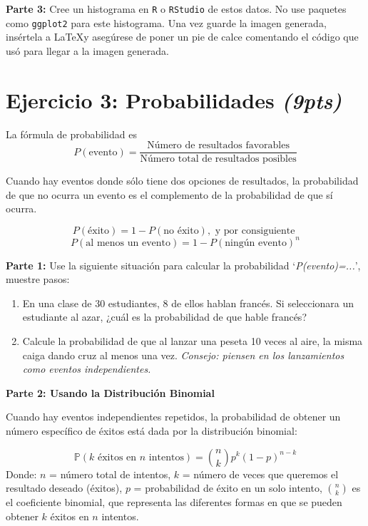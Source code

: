 \documentclass[11pt]{article}
\begin{document}
\textbf{Parte 3:} Cree un histograma en \texttt{R} o \texttt{RStudio} de estos datos. No use paquetes como \texttt{ggplot2} para este histograma. Una vez guarde la imagen generada, insértela a \LaTeX y asegúrese de poner un pie de calce comentando el código que usó para llegar a la imagen generada.
\vspace{3cm} %


\section*{Ejercicio 3: Probabilidades \textit{(9pts)}} 
La fórmula de probabilidad es
\[
P(\text{evento}) = \frac{\text{Número de resultados favorables}}{\text{Número total de resultados posibles}}
\]

Cuando hay eventos donde sólo tiene dos opciones de resultados, la probabilidad de que no ocurra un evento es el complemento de la probabilidad de que sí ocurra.

\[
P(\text{éxito}) = 1 - P(\text{no éxito}), \text{ y por consiguiente } 
\]
\[
P(\text{al menos un evento}) = 1 - P(\text{ningún evento})^n
\]

\textbf{Parte 1:} Use la siguiente situación para calcular la probabilidad ‘\textit{P(evento)=...}’, muestre pasos: 
\begin{enumerate}
    \item En una clase de 30 estudiantes, 8 de ellos hablan francés. Si seleccionara un estudiante al azar, ¿cuál es la probabilidad de que hable francés?

    \item Calcule la probabilidad de que al lanzar una peseta 10 veces al aire, la misma caiga dando cruz al menos una vez. \textit{Consejo: piensen en los lanzamientos como eventos independientes.}
\end{enumerate}
\vspace{2cm} %

\textbf{Parte 2: Usando la Distribución Binomial}

Cuando hay eventos independientes repetidos, la probabilidad de obtener un número específico de éxitos está dada por la distribución binomial:

\[
\mathds{P}(k \text{ éxitos en } n \text{ intentos}) = \binom{n}{k} p^k (1-p)^{n-k}
\]
Donde: $n$ = número total de intentos, $k$ = número de veces que queremos el resultado deseado (éxitos), $p$ = probabilidad de éxito en un solo intento, $\binom{n}{k}$ es el coeficiente binomial, que representa las diferentes formas en que se pueden obtener $k$ éxitos en $n$ intentos.
\end{document}
